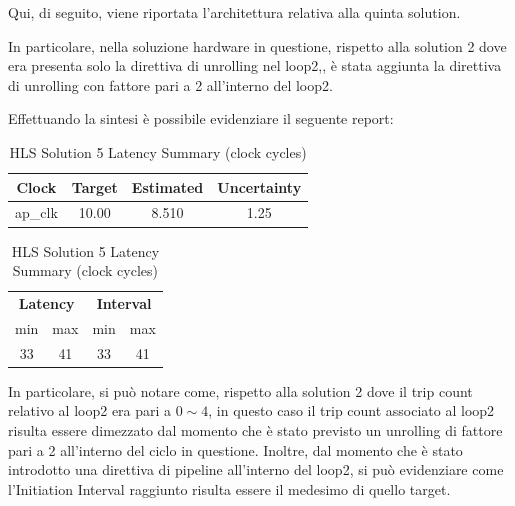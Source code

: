 Qui, di seguito, viene riportata l'architettura relativa alla quinta solution.



In particolare, nella soluzione hardware in questione, rispetto alla solution 2 dove era presenta solo la direttiva di unrolling nel loop2,, è stata aggiunta la direttiva di unrolling con fattore pari a 2 all'interno del loop2.

Effettuando la sintesi è possibile evidenziare il seguente report:\\

\begin{table}[H]
	\centering
	\begin{minipage}[t]{0.45\linewidth}
		\centering
		\begin{tabular}{|c|c|c|c|}
			\hline
			\textbf{Clock} & \textbf{Target} & \textbf{Estimated} & \textbf{Uncertainty} \\
			\hline
			ap\_clk & 10.00 & 8.510 & 1.25 \\
			\hline
		\end{tabular}
		\caption{HLS Solution 5 Timing Summary (ns)}
		\label{tab:hls-solution-5-timing-summary}
	\end{minipage}
	\hfill
	\begin{minipage}[t]{0.45\linewidth}
		\centering
		\begin{tabular}{|c|c|c|c|}
			\hline
			\multicolumn{2}{|c|}{\textbf{Latency}} & \multicolumn{2}{|c|}{\textbf{Interval}} \\
			min & max & min & max \\
			\hline
			33 & 41 & 33 & 41 \\
			\hline
		\end{tabular}
		\caption{HLS Solution 5 Latency Summary (clock cycles)}
		\label{tab:hls-solution-5-latency-summary}
	\end{minipage}
\end{table}

In particolare, si può notare come, rispetto alla solution 2 dove il trip count relativo al loop2 era pari a $0\sim4$, in questo caso il trip count associato al loop2 risulta essere dimezzato dal momento che è stato previsto un unrolling di fattore pari a 2 all'interno del ciclo in questione. Inoltre, dal momento che è stato introdotto una direttiva di pipeline all'interno del loop2, si può evidenziare come l'Initiation Interval raggiunto risulta essere il medesimo di quello target.

